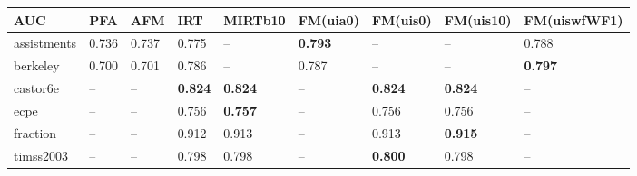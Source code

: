 \begin{tabular}{lllllllll}
\toprule
AUC &     PFA &     AFM &              IRT &          MIRTb10 &        FM(uia0) &        FM(uis0) &       FM(uis10) &    FM(uiswfWF1) \\
\midrule
assistments &  0.736 &  0.737 &           0.775 &               -- &  \textbf{0.793} &               -- &               -- &           0.788 \\
berkeley    &     0.700 &  0.701 &           0.786 &               -- &           0.787 &               -- &               -- &  \textbf{0.797} \\
castor6e    &      -- &      -- &  \textbf{0.824} &           \textbf{0.824} &               -- &  \textbf{0.824} &  \textbf{0.824} &               -- \\
ecpe    &      -- &      -- &  0.756 &           \textbf{0.757} &               -- &  0.756 &  0.756 &               -- \\
fraction    &      -- &      -- &           0.912 &           0.913 &               -- &           0.913 &  \textbf{0.915} &               -- \\
timss2003   &      -- &      -- &           0.798 &           0.798 &               -- &  \textbf{0.800} &           0.798 &               -- \\
\bottomrule
\end{tabular}
